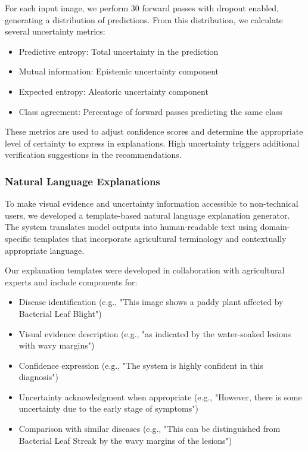 For each input image, we perform 30 forward passes with dropout enabled, generating a distribution of predictions. From this distribution, we calculate several uncertainty metrics:

\begin{itemize}
    \item Predictive entropy: Total uncertainty in the prediction
    \item Mutual information: Epistemic uncertainty component
    \item Expected entropy: Aleatoric uncertainty component
    \item Class agreement: Percentage of forward passes predicting the same class
\end{itemize}

These metrics are used to adjust confidence scores and determine the appropriate level of certainty to express in explanations. High uncertainty triggers additional verification suggestions in the recommendations.


\subsubsection{Natural Language Explanations}

To make visual evidence and uncertainty information accessible to non-technical users, we developed a template-based natural language explanation generator. The system translates model outputs into human-readable text using domain-specific templates that incorporate agricultural terminology and contextually appropriate language.

Our explanation templates were developed in collaboration with agricultural experts and include components for:

\begin{itemize}
    \item Disease identification (e.g., "This image shows a paddy plant affected by Bacterial Leaf Blight")
    \item Visual evidence description (e.g., "as indicated by the water-soaked lesions with wavy margins")
    \item Confidence expression (e.g., "The system is highly confident in this diagnosis")
    \item Uncertainty acknowledgment when appropriate (e.g., "However, there is some uncertainty due to the early stage of symptoms")
    \item Comparison with similar diseases (e.g., "This can be distinguished from Bacterial Leaf Streak by the wavy margins of the lesions")
\end{itemize}


